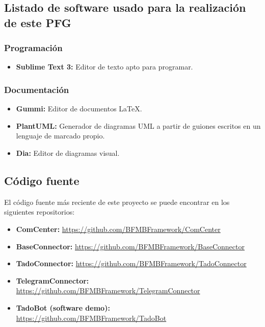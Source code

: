 \documentclass[spanish,12pt, a4paper, twoside]{paper}
\begin{document}
\subsection*{Listado de software usado para la realización de este PFG}

\subsubsection*{Programación}

\begin{itemize}
\item\textbf{Sublime Text 3:} Editor de texto apto para programar.
\end{itemize}

\subsubsection*{Documentación}

\begin{itemize}
\item\textbf{Gummi:} Editor de documentos \LaTeX.
\item\textbf{PlantUML:} Generador de diagramas UML a partir de guiones escritos en un lenguaje de marcado propio.
\item\textbf{Dia:} Editor de diagramas visual.
\end{itemize}

\subsection*{Código fuente}

El código fuente más reciente de este proyecto se puede encontrar en los siguientes repositorios:

\begin{itemize}
\item\textbf{ComCenter:} \url{https://github.com/BFMBFramework/ComCenter}
\item\textbf{BaseConnector:} \url{https://github.com/BFMBFramework/BaseConnector}
\item\textbf{TadoConnector:} \url{https://github.com/BFMBFramework/TadoConnector}
\item\textbf{TelegramConnector:} \url{https://github.com/BFMBFramework/TelegramConnector}
\item\textbf{TadoBot (software demo):} \url{https://github.com/BFMBFramework/TadoBot}
\end{itemize}
\end{document}
